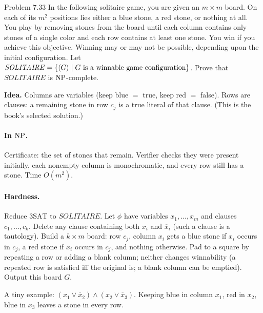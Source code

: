 \begin{question}{Problem 7.33}
In the following solitaire game, you are given an $m\times m$ board. On each of its $m^2$ positions lies either a blue stone, a red stone, or nothing at all. You play by removing stones from the board until each column contains only stones of a single color and each row contains at least one stone. You win if you achieve this objective. Winning may or may not be possible, depending upon the initial configuration. Let $\mathit{SOLITAIRE}=\{\langle G\rangle\mid G\text{ is a winnable game configuration}\}$. Prove that $\mathit{SOLITAIRE}$ is $\mathrm{NP}$-complete.
\end{question}
\begin{soln}
\textbf{Idea.} Columns are variables (keep blue $=$ true, keep red $=$ false). Rows are clauses: a remaining stone in row $c_j$ is a true literal of that clause. (This is the book's selected solution.)

\paragraph{In $\mathrm{NP}$.}
Certificate: the set of stones that remain. Verifier checks they were present initially, each nonempty column is monochromatic, and every row still has a stone. Time $O(m^2)$.

\paragraph{Hardness.}
Reduce $3\mathrm{SAT}$ to $\mathit{SOLITAIRE}$. Let $\phi$ have variables $x_1,\dots,x_m$ and clauses $c_1,\dots,c_k$. Delete any clause containing both $x_i$ and $\overline{x}_i$ (such a clause is a tautology). Build a $k\times m$ board: row $c_j$, column $x_i$ gets a blue stone if $x_i$ occurs in $c_j$, a red stone if $\overline{x}_i$ occurs in $c_j$, and nothing otherwise. Pad to a square by repeating a row or adding a blank column; neither changes winnability (a repeated row is satisfied iff the original is; a blank column can be emptied). Output this board $G$.

\begin{center}
\end{center}
A tiny example: $(x_1\lor\overline{x}_2)\land(x_2\lor\overline{x}_3)$. Keeping blue in column $x_1$, red in $x_2$, blue in $x_3$ leaves a stone in every row.


\end{soln}
